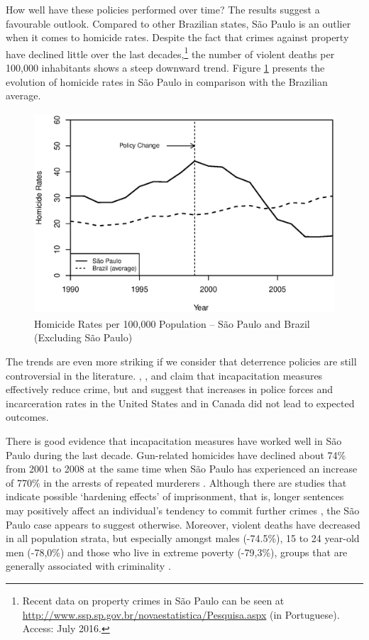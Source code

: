 How well have these policies performed over time? The results suggest a favourable outlook. Compared to other Brazilian states, São Paulo is an outlier when it comes to homicide rates. Despite the fact that crimes against property have declined little over the last decades,\footnote{Recent data on property crimes in São Paulo can be seen at \url{http://www.ssp.sp.gov.br/novaestatistica/Pesquisa.aspx} (in Portuguese). Access: July 2016.} the number of violent deaths per 100,000 inhabitants shows a steep downward trend. Figure \ref{fig:figure1} presents the evolution of homicide rates in São Paulo in comparison with the Brazilian average.

\begin{figure}[H]
    \centering
    \includegraphics[height=7.5cm]{images/br.eps}
    \caption{Homicide Rates per 100,000 Population -- São Paulo and Brazil (Excluding São Paulo)}
    \label{fig:figure1}
\end{figure}

The trends are even more striking if we consider that deterrence policies are still controversial in the literature. \citet{barbarino2014incapacitation}, \citet{buonanno2013incarceration}, \citet{levitt1996effect,levitt2004understanding} and \citet{owens2009more} claim that incapacitation measures effectively reduce crime, but \citet{eck2006have} and \citet{beattie2007police} suggest that increases in police forces and incarceration rates in the United States and in Canada did not lead to expected outcomes. 

There is good evidence that incapacitation measures have worked well in São Paulo during the last decade. Gun-related homicides have declined about 74\% from 2001 to 2008 \citep{peres2011queda} at the same time when São Paulo has experienced an increase of 770\% in the arrests of repeated murderers \citep[p. 36]{manso2012homicidos}. Although there are studies that indicate possible `hardening effects' of imprisonment, that is, longer sentences may positively affect an individual's tendency to commit further crimes \citep[e.g.][]{chen2007harsher,glaeser1996crime,western2001labor}, the São Paulo case appears to suggest otherwise. Moreover, violent deaths have decreased in all population strata, but especially amongst males (-74.5\%), 15 to 24 year-old men (-78,0\%) and those who live in extreme poverty (-79,3\%), groups that are generally associated with criminality \citep{peres2011queda}.

